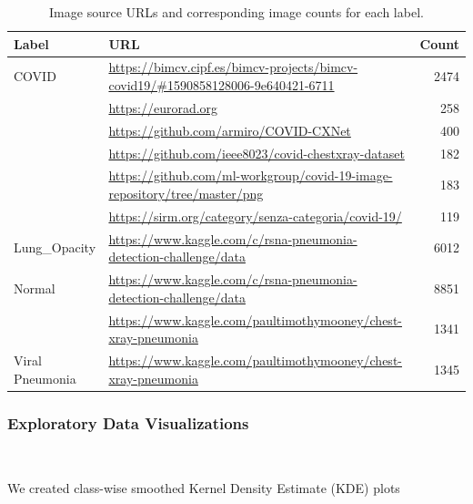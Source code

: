 \documentclass{article}
\begin{document}
\begin{table}[h!]
    \centering
    \begin{tabular}{|l|p{8cm}|r|}
        \hline
        \textbf{Label} & \textbf{URL} & \textbf{Count} \\
        \hline
        COVID & \url{https://bimcv.cipf.es/bimcv-projects/bimcv-covid19/#1590858128006-9e640421-6711} & 2474 \\
        \cline{2-3}
        & \url{https://eurorad.org} & 258 \\
        \cline{2-3}
        & \url{https://github.com/armiro/COVID-CXNet} & 400 \\
        \cline{2-3}
        & \url{https://github.com/ieee8023/covid-chestxray-dataset} & 182 \\
        \cline{2-3}
        & \url{https://github.com/ml-workgroup/covid-19-image-repository/tree/master/png} & 183 \\
        \cline{2-3}
        & \url{https://sirm.org/category/senza-categoria/covid-19/} & 119 \\
        \hline
        Lung\_Opacity & \url{https://www.kaggle.com/c/rsna-pneumonia-detection-challenge/data} & 6012 \\
        \hline
        Normal & \url{https://www.kaggle.com/c/rsna-pneumonia-detection-challenge/data} & 8851 \\
        \cline{2-3}
        & \url{https://www.kaggle.com/paultimothymooney/chest-xray-pneumonia} & 1341 \\
        \hline
        Viral Pneumonia & \url{https://www.kaggle.com/paultimothymooney/chest-xray-pneumonia} & 1345 \\
        \hline
    \end{tabular}
    \caption{Image source URLs and corresponding image counts for each label.}
    \label{tab:image-sources}
\end{table}




\newpage

\vspace{0.5 cm}

\subsubsection{Exploratory Data Visualizations}\

\vspace{0.3 cm}

We created class-wise smoothed Kernel Density Estimate (KDE) plots\\
\end{document}
